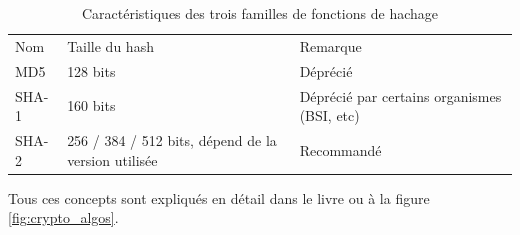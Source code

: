 \begin{table}[h]
	\vspace{0.5cm}
		\begin{tabular}{|p{3cm}|p{4cm}|p{9cm}|}
		\hline
		Nom & Taille du hash & Remarque \\ \Xhline{5\arrayrulewidth}
		MD5 & 128 bits  &  Déprécié \\ \hline
		SHA-1 & 160 bits & Déprécié par certains organismes (BSI\footnotemark[1], etc)  \\ \hline
		SHA-2 & 256 / 384 / 512 bits, dépend de la version utilisée & Recommandé \\ \hline
		\end{tabular}
	\caption{Caractéristiques des trois familles de fonctions de hachage}
	\label{hash_caracteristics}
\end{table}


Tous ces concepts sont expliqués en détail dans le livre \cite{understanding_cryp} ou à la figure \ref{fig:crypto_algos}.

\clearpage

\FloatBarrier




